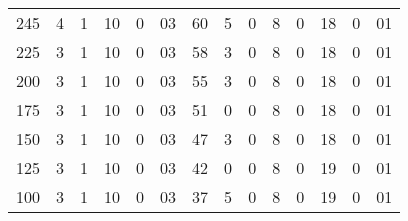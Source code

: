 \begin{table}
\begin{center}
\begin{tabular}{c|c||r@{.}l|r@{.}l||r@{.}l|r@{.}l||r@{.}l|r@{.}l}
245&	4&	1&10&	0&03&	60&5&	0&8&	0&18&	0&01\\
225&	3&	1&10&	0&03&	58&3&	0&8&	0&18&	0&01\\
200&	3&	1&10&	0&03&	55&3&	0&8&	0&18&	0&01\\
175&	3&	1&10&	0&03&	51&0&	0&8&	0&18&	0&01\\
150&	3&	1&10&	0&03&	47&3&	0&8&	0&18&	0&01\\
125&	3&	1&10&	0&03&	42&0&	0&8&	0&19&	0&01\\
100&	3&	1&10&	0&03&	37&5&	0&8&	0&19&	0&01\\
\end{tabular}
\end{center}
\end{table}
